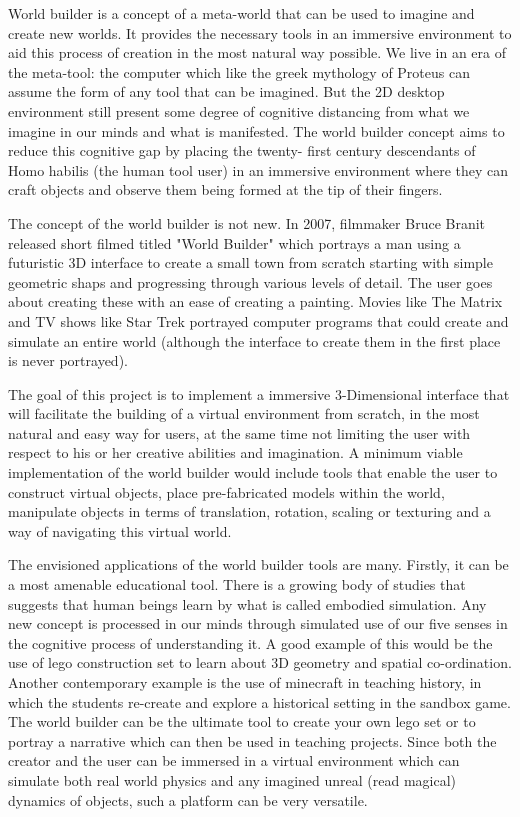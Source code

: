 World builder is a concept of a meta-world that can be used to imagine and create new worlds. It provides the necessary tools in an immersive
environment to aid this process of creation in the most natural way possible. We live in an era of the meta-tool: the computer which like the greek 
mythology of Proteus can assume the form of any tool that can be imagined. But the 2D desktop environment still present some degree of cognitive 
distancing from what we imagine in our minds and what is manifested. The world builder concept aims to reduce this cognitive gap by placing the twenty-
first century descendants of Homo habilis (the human tool user) in an immersive environment where they can craft objects and observe them being formed
at the tip of their fingers.


The concept of the world builder is not new. In 2007, filmmaker Bruce Branit released short filmed titled "World Builder" \cite{video:WorldBuilder}
which portrays a man using a futuristic 3D interface to create a small town from scratch starting with simple geometric shaps and progressing through
various levels of detail.  The user goes about creating these with an ease of creating a painting. Movies like The Matrix and TV shows like Star Trek
portrayed computer programs that could create and simulate an entire world (although the interface to create them in the first place is never
portrayed).


The goal of this project is to implement a immersive 3-Dimensional interface that will facilitate the building of a virtual environment from scratch, in
the most natural and easy way for users, at the same time not limiting the user with respect to his or her creative abilities and imagination. A 
minimum viable implementation of the world builder would include tools that enable the user to construct virtual objects, place pre-fabricated models 
within the world, manipulate objects in terms of translation, rotation, scaling or texturing and a way of navigating this virtual world.


The envisioned applications of the world builder tools are many. Firstly, it can be a most amenable educational tool. There is a growing body of studies 
that suggests that human beings learn by what is called embodied simulation. Any new concept is processed in our minds through simulated use of our five
senses in the cognitive process of understanding it. A good example of this would be the use of lego construction set to learn about 3D geometry and 
spatial co-ordination.  Another contemporary example is the use of minecraft in teaching history, in which the students re-create and explore a 
historical setting in the sandbox game. The world builder can be the ultimate tool to create your own lego set or to portray a narrative which can then
be used in teaching projects. Since both the creator and the user can be immersed in a virtual environment which can simulate both real world physics 
and any imagined unreal (read magical) dynamics of objects, such a platform can be very versatile. 


